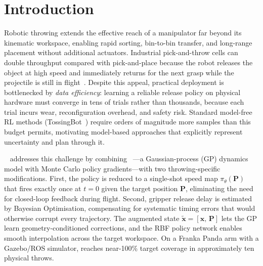 \section{Introduction}
\label{sec:introduction}

Robotic throwing extends the effective reach of a manipulator far beyond its kinematic
workspace, enabling rapid sorting, bin-to-bin transfer, and long-range placement without
additional actuators.
Industrial pick-and-throw cells can double throughput compared with pick-and-place
because the robot releases the object at high speed and immediately returns for the next
grasp while the projectile is still in flight~\cite{turcato2025mcpilot}.
Despite this appeal, practical deployment is bottlenecked by \emph{data efficiency}:
learning a reliable release policy on physical hardware must converge in tens of trials
rather than thousands, because each trial incurs wear, reconfiguration overhead, and
safety risk.
Standard model-free RL methods (\eg TossingBot~\cite{tossbot}) require orders of
magnitude more samples than this budget permits, motivating model-based approaches that
explicitly represent uncertainty and plan through it.

\mcpilot{}~\cite{turcato2025mcpilot} addresses this challenge by combining
\mcpilco{}~\cite{mcpilco}---a Gaussian-process (GP) dynamics model with Monte Carlo
policy gradients---with two throwing-specific modifications.
First, the policy is reduced to a single-shot speed map $\pi_\theta(\mathbf{P})$
that fires exactly once at $t{=}0$ given the target position $\mathbf{P}$, eliminating
the need for closed-loop feedback during flight.
Second, gripper release delay is estimated by Bayesian Optimisation, compensating for
systematic timing errors that would otherwise corrupt every trajectory.
The augmented state $\tilde{\mathbf{x}} = [\mathbf{x},\, \mathbf{P}]$ lets the GP learn
geometry-conditioned corrections, and the RBF policy network enables smooth interpolation
across the target workspace.
On a Franka Panda arm with a Gazebo/ROS simulator, \mcpilot{} reaches near-100\% target
coverage in approximately ten physical throws.

